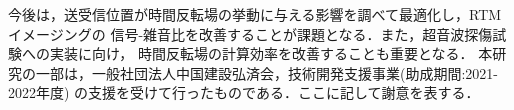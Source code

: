 \documentclass[jscefinal]{jjsce}%
\begin{document}
今後は，送受信位置が時間反転場の挙動に与える影響を調べて最適化し，RTMイメージングの
信号-雑音比を改善することが課題となる．また，超音波探傷試験への実装に向け，
時間反転場の計算効率を改善することも重要となる．
%
\Acknowledgment %
本研究の一部は，一般社団法人中国建設弘済会，技術開発支援事業(助成期間:2021-2022年度)
の支援を受けて行ったものである．ここに記して謝意を表する．
\end{document}
